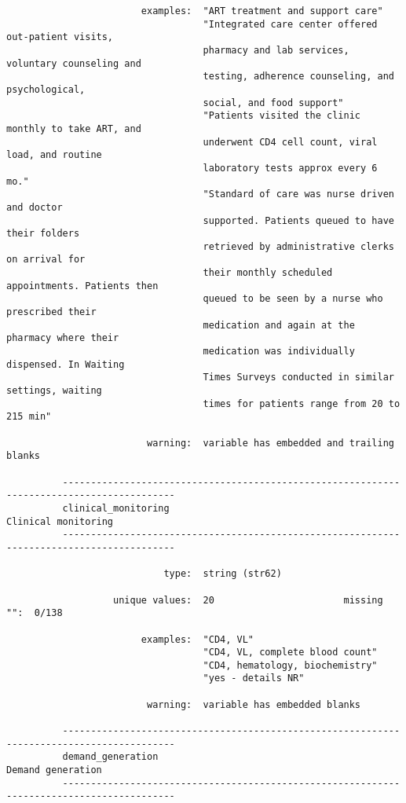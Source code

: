 \documentclass{article}
\begin{document}
\begin{verbatim}
                        examples:  "ART treatment and support care"
                                   "Integrated care center offered out-patient visits,
                                   pharmacy and lab services, voluntary counseling and
                                   testing, adherence counseling, and psychological,
                                   social, and food support"
                                   "Patients visited the clinic monthly to take ART, and
                                   underwent CD4 cell count, viral load, and routine
                                   laboratory tests approx every 6 mo."
                                   "Standard of care was nurse driven and doctor
                                   supported. Patients queued to have their folders
                                   retrieved by administrative clerks on arrival for
                                   their monthly scheduled appointments. Patients then
                                   queued to be seen by a nurse who prescribed their
                                   medication and again at the pharmacy where their
                                   medication was individually dispensed. In Waiting
                                   Times Surveys conducted in similar settings, waiting
                                   times for patients range from 20 to 215 min"
          
                         warning:  variable has embedded and trailing blanks
          
          ------------------------------------------------------------------------------------------
          clinical_monitoring                                                    Clinical monitoring
          ------------------------------------------------------------------------------------------
          
                            type:  string (str62)
          
                   unique values:  20                       missing "":  0/138
          
                        examples:  "CD4, VL"
                                   "CD4, VL, complete blood count"
                                   "CD4, hematology, biochemistry"
                                   "yes - details NR"
          
                         warning:  variable has embedded blanks
          
          ------------------------------------------------------------------------------------------
          demand_generation                                                        Demand generation
          ------------------------------------------------------------------------------------------
          

\end{verbatim}
\end{document}
